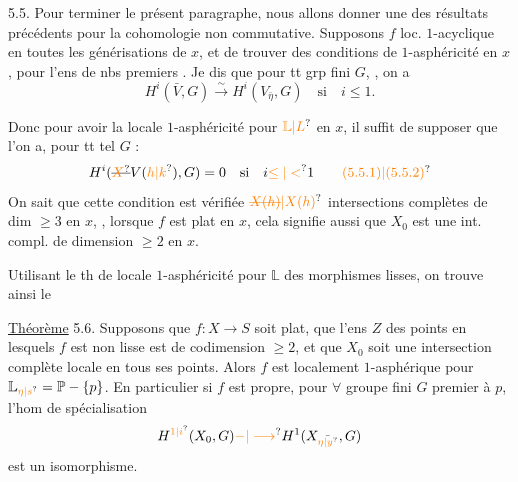 5.5. Pour terminer le présent paragraphe, nous allons donner une  des résultats précédents pour la cohomologie non commutative. Supposons $f$ loc. $1$-acyclique  en toutes les générisations de $x$,  et  de  trouver des conditions de  $1$-asphéricité en $x$, pour l'ens de nbs premiers .
Je dis que pour tt grp fini $G$, , on a
\[
H^i(\bar{V},G)\xrightarrow{\sim}H^i(V_{\bar{\eta}},G)\quad\text{si}\quad i\leq1.
\tag*{(5.5.1)}
\]

Donc pour avoir la locale $1$-asphéricité pour $\unsure{\mathbb{L}|L}$ en $x$, il suffit de supposer que l'on a, pour tt tel $G$ :
\[
H^i(\deleted{\unsure{X}}V(\unsure{h|k}),G)=0\quad\text{si}\quad i\unsure{\leq|<}1
\tag*{\unsure{(5.5.1)|(5.5.2)}}
\]
On sait  que cette condition est vérifiée   $\unsure{\deleted{X(h)}|X(h)}$   intersections complètes de dim $\geq3$ en $x$, , lorsque $f$ est plat en $x$, cela signifie aussi que $X_0$ est une int. compl. de dimension $\geq2$ en $x$.

Utilisant le th de locale $1$-asphéricité pour $\mathbb{L}$ des morphismes lisses, on trouve ainsi le

\uline{Théorème} 5.6. Supposons que $f:X\longrightarrow S$ soit plat, que l'ens $Z$ des points  en lesquels $f$ est non lisse est de codimension $\geq2$, et que $X_0$ soit une intersection complète locale en tous ses points. Alors $f$ est localement $1$-asphérique pour $\mathbb{L}_{\unsure{\eta|s}}=\mathbb{P}-\{p\}$. En particulier si $f$ est propre,  pour $\forall$ groupe fini $G$  premier à $p$, l'hom de spécialisation
\[
H^{\unsure{1|i}}(X_0,G)\unsure{-|\longrightarrow}H^1(X_{\bar{\unsure{\eta|y}}},G)
\]
est un isomorphisme.

